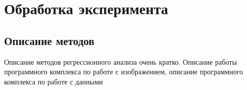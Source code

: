 \chapter{Обработка эксперимента}\label{chapt3}

\section{Описание методов}\label{sect3_1}
Описание методов регрессионного анализа очень кратко. Описание работы программного комплекса по работе с изображением, описание программного комплекса по работе с данными